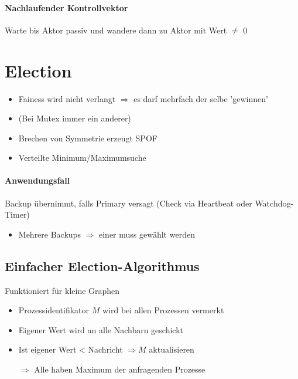 \documentclass{scrartcl}
\begin{document}
\paragraph{Nachlaufender Kontrollvektor} Warte bis Aktor passiv und wandere dann zu Aktor mit Wert $\neq$ 0



\newpage
%
%

\section{Election}

\begin{itemize}
\item Fainess wird nicht verlangt $\Rightarrow$ es darf mehrfach der selbe 'gewinnen'
\item (Bei Mutex immer ein anderer)
\item \Lightning Brechen von Symmetrie erzeugt SPOF
\item Verteilte Minimum/Maximumsuche
\end{itemize}
\paragraph{Anwendungsfall} Backup übernimmt, falls Primary versagt (Check via Heartbeat oder Watchdog-Timer)
\begin{itemize}
\item Mehrere Backups $\Rightarrow$ einer muss gewählt werden
\end{itemize}


\subsection{Einfacher Election-Algorithmus}
Funktioniert für kleine Graphen
\begin{itemize}
\item Prozessidentifikator $M$ wird bei allen Prozessen vermerkt 
\item Eigener Wert wird an alle Nachbarn geschickt
\item Ist eigener Wert < Nachricht $\Rightarrow M$ aktualisieren
\item[$\Rightarrow$] Alle haben Maximum der anfragenden Prozesse
\end{itemize}



\newpage
%
%
\end{document}
